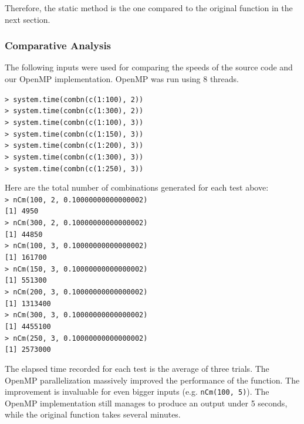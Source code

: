 Therefore, the static method is the one compared to the original function in the next section.

\subsubsection{Comparative Analysis}
The following inputs were used for comparing the speeds of the source code and our OpenMP implementation. OpenMP was run using 8 threads.\\
\null

\texttt{> system.time(combn(c(1:100), 2))}\\
\texttt{> system.time(combn(c(1:300), 2))}\\
\texttt{> system.time(combn(c(1:100), 3))}\\
\texttt{> system.time(combn(c(1:150), 3))}\\
\texttt{> system.time(combn(c(1:200), 3))}\\
\texttt{> system.time(combn(c(1:300), 3))}\\
\texttt{> system.time(combn(c(1:250), 3))}\\
\null

Here are the total number of combinations generated for each test above:\\
\null
\texttt{> nCm(100, 2, 0.10000000000000002)}\\
\texttt{[1] 4950}\\
\texttt{> nCm(300, 2, 0.10000000000000002)}\\
\texttt{[1] 44850}\\
\texttt{> nCm(100, 3, 0.10000000000000002)}\\
\texttt{[1] 161700}\\
\texttt{> nCm(150, 3, 0.10000000000000002)}\\
\texttt{[1] 551300}\\
\texttt{> nCm(200, 3, 0.10000000000000002)}\\
\texttt{[1] 1313400}\\
\texttt{> nCm(300, 3, 0.10000000000000002)}\\
\texttt{[1] 4455100}\\
\texttt{> nCm(250, 3, 0.10000000000000002)}\\
\texttt{[1] 2573000}\\
\null

The elapsed time recorded for each test is the average of three trials. The OpenMP parallelization massively improved the performance of the function. The improvement is invaluable for even bigger inputs (e.g. \texttt{nCm(100, 5)}). The OpenMP implementation still manages to produce an output under 5 seconds, while the original function takes several minutes.\\
\null

